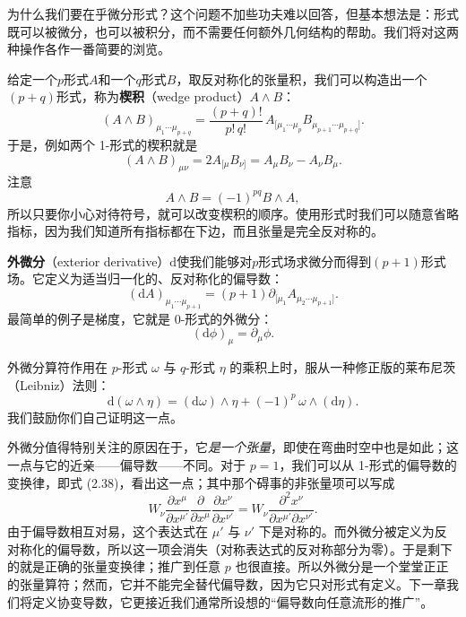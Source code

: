 为什么我们要在乎微分形式？这个问题不加些功夫难以回答，但基本想法是：形式既可以被微分，也可以被积分，而不需要任何额外几何结构的帮助。我们将对这两种操作各作一番简要的浏览。

给定一个$p$形式$A$和一个$q$形式$B$，取反对称化的张量积，我们可以构造出一个$(p+q)$形式，称为\textbf{楔积}（wedge product）$A\wedge B$：
\begin{equation*}
(A\wedge B)_{\mu_1\cdots\mu_{p+q}}=\frac{(p+q)!}{p!\,q!}\,A_{[\mu_1\cdots\mu_p}B_{\mu_{p+1}\cdots\mu_{p+q}]}.
\tag{2.73}
\end{equation*}
于是，例如两个 1-形式的楔积就是
\begin{equation*}
(A\wedge B)_{\mu\nu}=2A_{[\mu}B_{\nu]}=A_\mu B_\nu-A_\nu B_\mu.
\tag{2.74}
\end{equation*}
注意
\begin{equation*}
A\wedge B=(-1)^{pq}B\wedge A,
\tag{2.75}
\end{equation*}
所以只要你小心对待符号，就可以改变楔积的顺序。使用形式时我们可以随意省略指标，因为我们知道所有指标都在下边，而且张量是完全反对称的。

\textbf{外微分}（exterior derivative）$\mathrm{d}$使我们能够对$p$形式场求微分而得到$(p+1)$形式场。它定义为适当归一化的、反对称化的偏导数：
\begin{equation*}
(\mathrm{d}A)_{\mu_1\cdots\mu_{p+1}}=(p+1)\partial_{[\mu_1}A_{\mu_2\cdots\mu_{p+1}]}.
\tag{2.76}
\end{equation*}
最简单的例子是梯度，它就是 0-形式的外微分：
\begin{equation*}
(\mathrm{d}\phi)_\mu=\partial_\mu\phi.
\tag{2.77}
\end{equation*}

外微分算符作用在 $p$-形式 $\omega$ 与 $q$-形式 $\eta$ 的乘积上时，服从一种修正版的莱布尼茨（Leibniz）法则：
\begin{equation*}
\mathrm{d}(\omega\wedge\eta)=(\mathrm{d}\omega)\wedge\eta+(-1)^{p}\,\omega\wedge(\mathrm{d}\eta). \tag{2.78}
\end{equation*}
我们鼓励你们自己证明这一点。

外微分值得特别关注的原因在于，它\emph{是一个张量}，即使在弯曲时空中也是如此；这一点与它的近亲——偏导数——不同。对于 $p=1$，我们可以从 1-形式的偏导数的变换律，即式 (2.38)，看出这一点；其中那个碍事的非张量项可以写成
\begin{equation*}
W_{\nu}\frac{\partial x^{\mu}}{\partial x^{\mu'}}\frac{\partial}{\partial x^{\mu}}\frac{\partial x^{\nu}}{\partial x^{\nu'}}=W_{\nu}\frac{\partial^{2}x^{\nu}}{\partial x^{\mu'}\partial x^{\nu'}}. \tag{2.79}
\end{equation*}
由于偏导数相互对易，这个表达式在 $\mu'$ 与 $\nu'$ 下是对称的。而外微分被定义为反对称化的偏导数，所以这一项会消失（对称表达式的反对称部分为零）。于是剩下的就是正确的张量变换律；推广到任意 $p$ 也很直接。所以外微分是一个堂堂正正的张量算符；然而，它并不能完全替代偏导数，因为它只对形式有定义。下一章我们将定义协变导数，它更接近我们通常所设想的“偏导数向任意流形的推广”。

